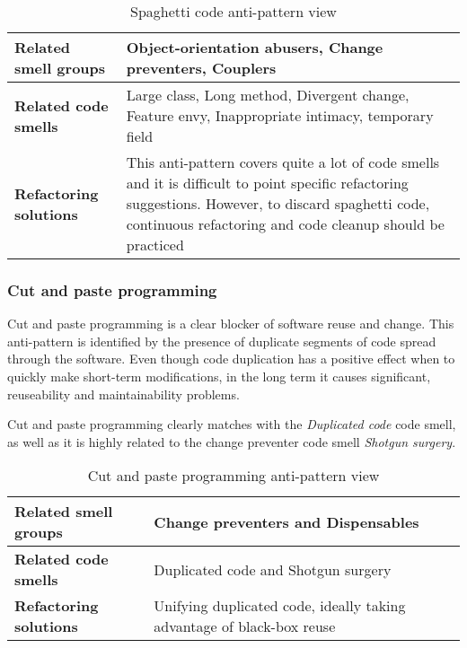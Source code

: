 \begin{table}[ht!]
\centering
\caption{Spaghetti code anti-pattern view}
\label{table:SpaghettiCode}
    \begin{tabular}{ p{5cm} p{9cm} }
     \hline
     \textbf{Related smell groups}  &Object-orientation abusers, Change preventers, Couplers\\
     \hline
     \textbf{Related code smells}  &Large class, Long method, Divergent change, Feature envy, Inappropriate intimacy, temporary field\\
     \hline
     \textbf{Refactoring solutions}  &This anti-pattern covers quite a lot of code smells and it is difficult to point specific refactoring suggestions. However, to discard spaghetti code, continuous refactoring and code cleanup should be practiced\\
     \hline
    \end{tabular}
\end{table}

\subsubsection*{Cut and paste programming}
Cut and paste programming is a clear blocker of software reuse and change. This anti-pattern is identified by the presence of duplicate segments of code spread through the software. Even though code duplication has a positive effect when to quickly make short-term modifications, in the long term it causes significant, reuseability and maintainability problems.

Cut and paste programming clearly matches with the \textit{Duplicated code} code smell, as well as it is highly related to the change preventer code smell \textit{Shotgun surgery}.

\begin{table}[ht!]
\centering
\caption{Cut and paste programming anti-pattern view}
\label{table:CutPaste}
    \begin{tabular}{ p{5cm} p{9cm} }
     \hline
     \textbf{Related smell groups}  &Change preventers and Dispensables\\
     \hline
     \textbf{Related code smells}  &Duplicated code and Shotgun surgery\\
     \hline
     \textbf{Refactoring solutions}  &Unifying duplicated code, ideally taking advantage of black-box reuse\\
     \hline
    \end{tabular}
\end{table}

